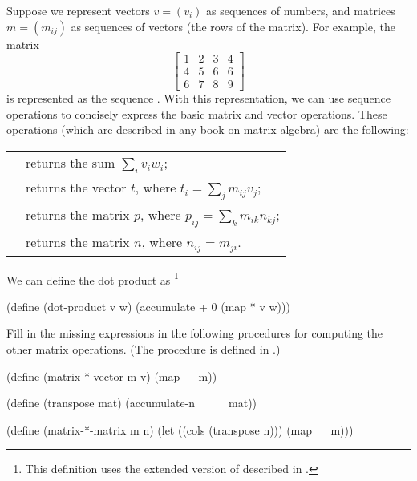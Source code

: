 \begin{exercise}
	\label{Exercise 2.37}
	Suppose we represent vectors \( v = (v_i) \) as sequences of numbers, and matrices \( m = (m_{ij}) \) as sequences of vectors (the rows of the matrix).
	For example, the matrix
	\[
	\begin{bmatrix}
		1 & 2 & 3 & 4 \\
		4 & 5 & 6 & 6 \\
		6 & 7 & 8 & 9
	\end{bmatrix}
	\]
	is represented as the sequence .
	With this representation, we can use sequence operations to concisely express the basic matrix and vector operations.
	These operations (which are described in any book on matrix algebra) are the following:
	\begin{center}
		\begingroup
		\renewcommand{\arraystretch}{1.5}
		\begin{tabular}{ll}
			\code{(dot-product v w)}
			&
			returns the sum \( ∑_i v_i w_i \);
			\\
			\code{(matrix-*-vector m v)}
			&
			\makecell{
				returns the vector \( t \), \\
				where \( t_i = ∑_j m_{ij} v_j \);
			}
			\\
			\code{(matrix-*-matrix m n)}
			&
			\makecell{
				returns the matrix \( p \), \\
				where \( p_{ij} = ∑_k m_{ik} n_{kj} \);
			}
			\\
			\code{(transpose m)}
			&
			\makecell{
				returns the matrix \( n \), \\
				where \( n_{ij} = m_{ji} \).
			}
		\end{tabular}
		\endgroup
	\end{center}
	We can define the dot product as%
	\footnote{
		This definition uses the extended version of  described in .
	}
	\begin{scheme}
	  (define (dot-product v w)
	    (accumulate + 0 (map * v w)))
	\end{scheme}
	Fill in the missing expressions in the following procedures for computing the other matrix operations.
	(The procedure  is defined in .)
	\begin{scheme}
	  (define (matrix-*-vector m v)
	    (map ~~ m))

	  (define (transpose mat)
	    (accumulate-n ~~ ~~ mat))

	  (define (matrix-*-matrix m n)
	    (let ((cols (transpose n)))
	      (map ~~ m)))
	\end{scheme}
\end{exercise}



